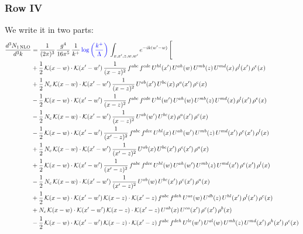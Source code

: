\documentclass[9pt]{article}
\numberwithin{equation}{section}
\begin{document}
\subsubsection{Row IV}
We write it in two parts: 
\begin{align}
\frac{d^{3}N_{1\,\mathrm{NLO}}}{d^{3}k} & = \frac{1}{(2\pi)^{3}}\,\frac{g^{4}}{16\pi^{5}}\,\frac{1}{k^{+}}\,{\color{blue}\log{\left(\frac{k^{+}}{\Lambda}\right)}}\,\int_{x,x',z,w,w'}e^{-ik(w'-w)}\,\Bigg[\notag\\ & 
 +\frac{1}{2}\,\mathcal{K}(x-w)\cdot\mathcal{K}(x'-w')\,\frac{1}{(x-z)^{2}}\,f^{abc}\,f^{cde}\,U^{hl}(x')\,U^{ah}(w)\,U^{mb}(z)\,U^{md}(x)\,\rho^{l}(x')\,\rho^{e}(x)\notag\\
& +\frac{1}{2}\,N_{c}\,\mathcal{K}(x-w)\cdot\mathcal{K}(x'-w')\,\frac{1}{(x-z)^{2}}\,U^{ab}(x')\,U^{bc}(x)\,\rho^{a}(x')\,\rho^{c}(x)\notag\\
& -\frac{1}{2}\,\mathcal{K}(x-w)\cdot\mathcal{K}(x'-w')\,\frac{1}{(x-z)^{2}}\,f^{abc}\,f^{cde}\,U^{hl}(w')\,U^{ah}(w)\,U^{mb}(z)\,U^{md}(x)\,\rho^{l}(x')\,\rho^{e}(x)\notag\\
& -\frac{1}{2}\,N_{c}\,\mathcal{K}(x-w)\cdot\mathcal{K}(x'-w')\,\frac{1}{(x-z)^{2}}\,U^{ab}(w')\,U^{bc}(x)\,\rho^{a}(x')\,\rho^{c}(x)\notag\\
& -\frac{1}{2}\,\mathcal{K}(x-w)\cdot\mathcal{K}(x'-w')\,\frac{1}{(x'-z)^{2}}\,f^{abc}\,f^{dce}\,U^{hl}(x)\,U^{ah}(w')\,U^{mb}(z)\,U^{md}(x')\,\rho^{e}(x')\,\rho^{l}(x)\notag\\
& +\frac{1}{2}\,N_{c}\,\mathcal{K}(x-w)\cdot\mathcal{K}(x'-w')\,\frac{1}{(x'-z)^{2}}\,U^{ab}(x)\,U^{bc}(x')\,\rho^{c}(x')\,\rho^{a}(x)\notag\\
& +\frac{1}{2}\,\mathcal{K}(x-w)\cdot\mathcal{K}(x'-w')\,\frac{1}{(x'-z)^{2}}\,f^{abc}\,f^{dce}\,U^{hl}(w)\,U^{ah}(w')\,U^{mb}(z)\,U^{md}(x')\,\rho^{e}(x')\,\rho^{l}(x)\notag\\
& -\frac{1}{2}\,N_{c}\,\mathcal{K}(x-w)\cdot\mathcal{K}(x'-w')\,\frac{1}{(x'-z)^{2}}\,U^{ab}(w)\,U^{bc}(x')\,\rho^{c}(x')\,\rho^{a}(x)\notag\\
& +\frac{1}{2}\,\mathcal{K}(x-w)\cdot\mathcal{K}(x'-w')\,\mathcal{K}(x-z)\cdot\mathcal{K}(x'-z)\,f^{abc}\,f^{deh}\,U^{ae}(w)\,U^{db}(z)\,U^{hl}(x')\,\rho^{l}(x')\,\rho^{c}(x)\notag\\
& +N_{c}\,\mathcal{K}(x-w)\cdot\mathcal{K}(x'-w')\,\mathcal{K}(x-z)\cdot\mathcal{K}(x'-z)\,U^{ab}(x)\,U^{ca}(x')\,\rho^{c}(x')\,\rho^{b}(x)\notag\\
& -\frac{1}{2}\,\mathcal{K}(x-w)\cdot\mathcal{K}(x'-w')\,\mathcal{K}(x-z)\cdot\mathcal{K}(x'-z)\,f^{abc}\,f^{deh}\,U^{le}(w')\,U^{al}(w)\,U^{mb}(z)\,U^{md}(x')\,\rho^{h}(x')\,\rho^{c}(x)\notag\\

\end{align}
\end{document}
